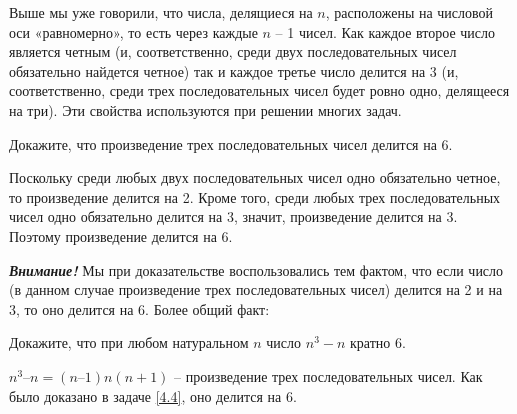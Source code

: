 
Выше мы уже говорили, что числа, делящиеся на $n$, расположены на числовой оси «равномерно», то есть через каждые $n$ – 1 чисел. Как каждое второе число является четным (и, соответственно, среди двух последовательных чисел обязательно найдется четное) так и каждое третье число делится на 3 (и, соответственно, среди трех последовательных чисел будет ровно одно, делящееся на три). Эти свойства используются при решении многих задач.

\begin{thm}\label{4.4}
	Докажите, что произведение трех последовательных чисел делится на 6.
\end{thm}

\begin{dok}
    Поскольку среди любых двух последовательных чисел одно обязательно четное, то произведение делится на 2. Кроме того, среди любых трех последовательных чисел одно обязательно делится на 3, значит, произведение делится на 3. Поэтому произведение делится на 6. 
\end{dok}
\begin{floatingfigure}[L]{0\textwidth}
\end{floatingfigure}

\textit{\textbf{Внимание!}} Мы при доказательстве воспользовались тем фактом, что если число (в данном случае произведение трех последовательных чисел) делится на 2 и на 3, то оно делится на 6. Более общий факт: 


\begin{thm} 
	Докажите, что при любом натуральном $n$ число $n^3 - n$ кратно 6.
\end{thm}

\begin{dok}
    $n^3 – n  =  (n – 1) n (n + 1)$ – произведение трех последовательных чисел. Как было доказано в задаче \ref{4.4}, оно делится на 6.
\end{dok}
\begin{floatingfigure}[L]{0\textwidth}
\end{floatingfigure}

